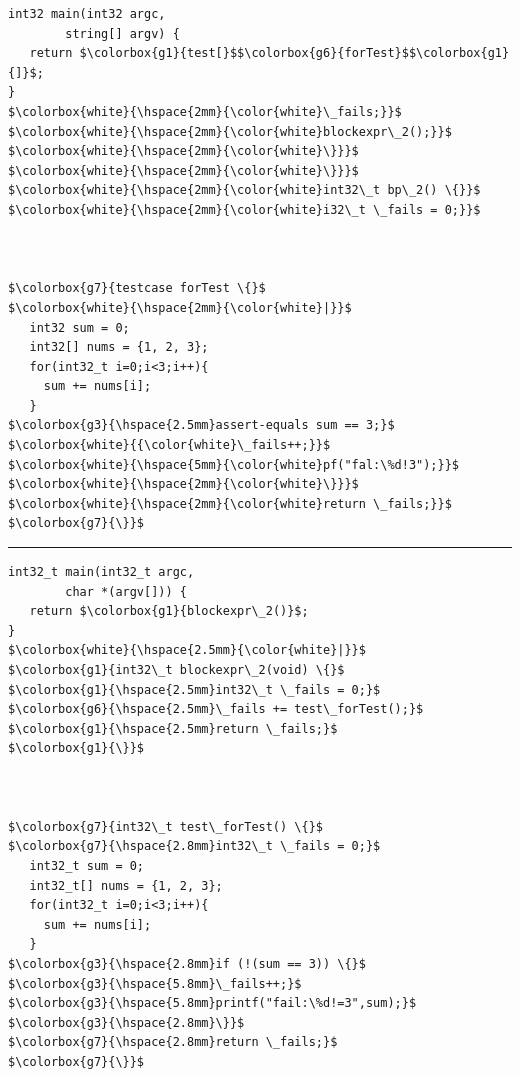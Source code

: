 \noindent 
\begin{minipage}[t]{120pt} 
\begin{lstlisting}[language=reducedMbeddr]
int32 main(int32 argc,
		string[] argv) {
   return $\colorbox{g1}{test[}$$\colorbox{g6}{forTest}$$\colorbox{g1}{]}$;
}
$\colorbox{white}{\hspace{2mm}{\color{white}\_fails;}}$
$\colorbox{white}{\hspace{2mm}{\color{white}blockexpr\_2();}}$
$\colorbox{white}{\hspace{2mm}{\color{white}\}}}$
$\colorbox{white}{\hspace{2mm}{\color{white}\}}}$
$\colorbox{white}{\hspace{2mm}{\color{white}int32\_t bp\_2() \{}}$ 
$\colorbox{white}{\hspace{2mm}{\color{white}i32\_t \_fails = 0;}}$		



$\colorbox{g7}{testcase forTest \{}$ 
$\colorbox{white}{\hspace{2mm}{\color{white}|}}$
   int32 sum = 0;
   int32[] nums = {1, 2, 3};
   for(int32_t i=0;i<3;i++){
     sum += nums[i];
   }
$\colorbox{g3}{\hspace{2.5mm}assert-equals sum == 3;}$
$\colorbox{white}{{\color{white}\_fails++;}}$
$\colorbox{white}{\hspace{5mm}{\color{white}pf("fal:\%d!3");}}$
$\colorbox{white}{\hspace{2mm}{\color{white}\}}}$
$\colorbox{white}{\hspace{2mm}{\color{white}return \_fails;}}$
$\colorbox{g7}{\}}$
\end{lstlisting}
\end{minipage} 
\hfill 
\rule[-61ex]{0.2ex}{27.2em}
\begin{minipage}[t]{130pt} 
\begin{lstlisting}[language=reducedMbeddr]
int32_t main(int32_t argc,
		char *(argv[])) {
   return $\colorbox{g1}{blockexpr\_2()}$;
}  
$\colorbox{white}{\hspace{2.5mm}{\color{white}|}}$
$\colorbox{g1}{int32\_t blockexpr\_2(void) \{}$
$\colorbox{g1}{\hspace{2.5mm}int32\_t \_fails = 0;}$
$\colorbox{g6}{\hspace{2.5mm}\_fails += test\_forTest();}$
$\colorbox{g1}{\hspace{2.5mm}return \_fails;}$
$\colorbox{g1}{\}}$



$\colorbox{g7}{int32\_t test\_forTest() \{}$
$\colorbox{g7}{\hspace{2.8mm}int32\_t \_fails = 0;}$
   int32_t sum = 0;
   int32_t[] nums = {1, 2, 3};
   for(int32_t i=0;i<3;i++){
     sum += nums[i];
   }
$\colorbox{g3}{\hspace{2.8mm}if (!(sum == 3)) \{}$
$\colorbox{g3}{\hspace{5.8mm}\_fails++;}$
$\colorbox{g3}{\hspace{5.8mm}printf("fail:\%d!=3",sum);}$
$\colorbox{g3}{\hspace{2.8mm}\}}$
$\colorbox{g7}{\hspace{2.8mm}return \_fails;}$
$\colorbox{g7}{\}}$
\end{lstlisting}
\end{minipage} 
